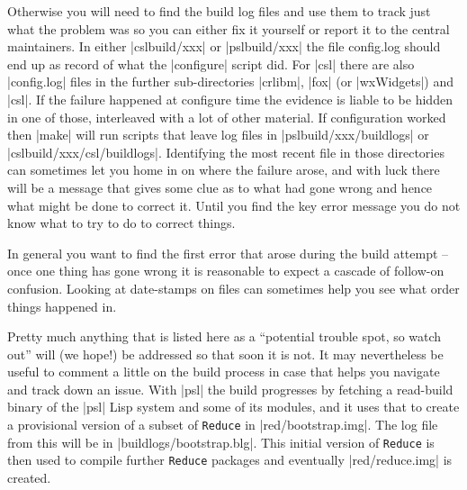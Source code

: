 \documentclass[12pt,twoside,openright]{memoir}
\newcommand{\reduce}{\texttt{Reduce}\xspace}
\begin{document}
\begin{enumerate}
Otherwise you will need to find the build log files and use them to track
just what the problem was so you can either fix it yourself or report it
to the central maintainers. In either |cslbuild/xxx| or |pslbuild/xxx| the
file config.log should end up as record of what the |configure| script did.
For |csl| there are also |config.log| files in the further sub-directories
|crlibm|, |fox| (or |wxWidgets|) and |csl|. If the failure happened at
configure time the evidence is liable to be hidden in one of those, interleaved
with a lot of other material. If configuration worked then |make| will run
scripts that leave log files in |pslbuild/xxx/buildlogs| or
|cslbuild/xxx/csl/buildlogs|. Identifying the most recent file in those
directories can sometimes let you home in on where the failure arose,
and with luck there will be a message that gives some clue as to what had gone
wrong and hence what might be done to correct it. Until you find the key
error message you do not know what to try to do to correct things.

In general you want to find the first error that arose during the build attempt
-- once one thing has gone wrong it is reasonable to expect a cascade of
follow-on confusion. Looking at date-stamps on files can sometimes help you see
what order things happened in.

Pretty much anything that is listed here as a ``potential trouble spot, so
watch out'' will (we hope!) be addressed so that soon it is not. It may
nevertheless be useful to comment a little on the build process in case that
helps you navigate and track down an issue. With |psl| the build progresses by
fetching a read-build binary of the |psl| Lisp system and some of its
modules, and it uses that to create a provisional version of a subset of
\reduce in |red/bootstrap.img|. The log file from this will be in
|buildlogs/bootstrap.blg|. This initial version of \reduce is then used to
compile further \reduce packages and eventually |red/reduce.img| is created.


\end{enumerate}
\end{document}
